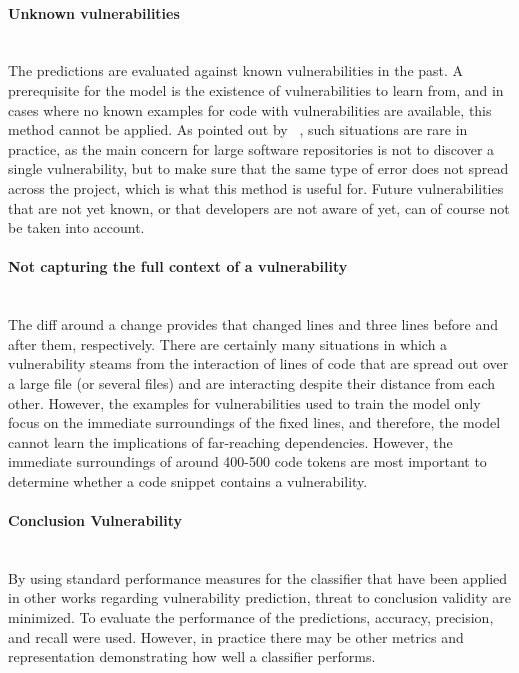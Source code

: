 \documentclass[
	a4paper,
	pagesize,
	pdftex,
	12pt,
	twoside, %
	BCOR=5mm, %
	ngerman,
	fleqn,
	final,
	]{scrartcl}
\begin{document}
\paragraph{Unknown vulnerabilities}\mbox{}\\
The predictions are evaluated against known vulnerabilities in the past. A prerequisite for the model is the existence of vulnerabilities to learn from, and in cases where no known examples for code with vulnerabilities are available, this method cannot be applied. As pointed out by ~\cite{Yamaguchi.2012}, such situations are rare in practice, as the main concern for large software repositories is not to discover a single vulnerability, but to make sure that the same type of error does not spread across the project, which is what this method is useful for. Future vulnerabilities that are not yet known, or that developers are not aware of yet, can of course not be taken into account.
\paragraph{Not capturing the full context of a vulnerability}\mbox{}\\
The diff around a change provides that changed lines and three lines before and after them, respectively. There are certainly many situations in which a vulnerability steams from the interaction of lines of code that are spread out over a large file (or several files) and are interacting despite their distance from each other. However, the examples for vulnerabilities used to train the model only focus on the immediate surroundings of the fixed lines, and therefore, the model cannot learn the implications of far-reaching dependencies. However, the immediate surroundings of around 400-500 code tokens are most important to determine whether a code snippet contains a vulnerability. %
\paragraph{Conclusion Vulnerability}\mbox{}\\
By using standard performance measures for the classifier that have been applied in other works regarding vulnerability prediction, threat to conclusion validity are minimized. To evaluate the performance of the predictions, accuracy, precision, and recall were used. However, in practice there may be other metrics and representation demonstrating how well a classifier performs.
\end{document}
